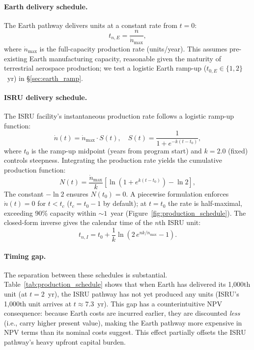 \documentclass[preprint,12pt]{elsarticle}
\begin{document}
\paragraph{Earth delivery schedule.} The Earth pathway delivers units at a constant rate from $t = 0$:
\begin{equation}
  t_{n,E} = \frac{n}{\dot{n}_{\max}},
  \label{eq:earth_schedule}
\end{equation}
where $\dot{n}_{\max}$ is the full-capacity production rate (units/year). This assumes pre-existing Earth manufacturing capacity, reasonable given the maturity of terrestrial aerospace production; we test a logistic Earth ramp-up ($t_{0,E} \in \{1, 2\}$~yr) in \S\ref{sec:earth_ramp}.

\paragraph{ISRU delivery schedule.} The ISRU facility's instantaneous production rate follows a logistic ramp-up function:
\begin{equation}
  \dot{n}(t) = \dot{n}_{\max} \cdot S(t), \quad S(t) = \frac{1}{1 + e^{-k(t - t_0)}},
  \label{eq:scurve}
\end{equation}
where $t_0$ is the ramp-up midpoint (years from program start) and $k = 2.0$ (fixed) controls steepness. Integrating the production rate yields the cumulative production function:
\begin{equation}
  N(t) = \frac{\dot{n}_{\max}}{k} \left[ \ln\!\left(1 + e^{k(t - t_0)}\right) - \ln 2 \right],
  \label{eq:cumulative_production}
\end{equation}
The constant $-\ln 2$ ensures $N(t_0) = 0$. A piecewise formulation enforces $\dot{n}(t) = 0$ for $t < t_c$ ($t_c = t_0 - 1$ by default); at $t = t_0$ the rate is half-maximal, exceeding 90\% capacity within ${\sim}1$~year (Figure~\ref{fig:production_schedule}). The closed-form inverse gives the calendar time of the $n$th ISRU unit:
\begin{equation}
  t_{n,I} = t_0 + \frac{1}{k} \ln\!\left(2\,e^{nk/\dot{n}_{\max}} - 1\right).
  \label{eq:production_schedule}
\end{equation}

\paragraph{Timing gap.} The separation between these schedules is substantial. Table~\ref{tab:production_schedule} shows that when Earth has delivered its 1{,}000th unit (at $t = 2$~yr), the ISRU pathway has not yet produced any units (ISRU's 1{,}000th unit arrives at $t \approx 7.3$~yr). This gap has a counterintuitive NPV consequence: because Earth costs are incurred earlier, they are discounted \emph{less} (i.e., carry higher present value), making the Earth pathway more expensive in NPV terms than its nominal costs suggest. This effect partially offsets the ISRU pathway's heavy upfront capital burden.
\end{document}
